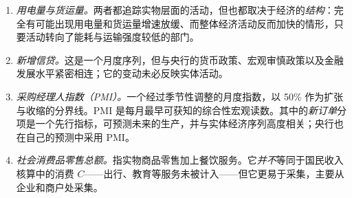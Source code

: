 \begin{enumerate}
    \item \emph{用电量与货运量。}两者都追踪实物层面的活动，但也都取决于经济的\emph{结构}：完全有可能出现用电量和货运量增速放缓、而整体经济活动反而加快的情形，只要活动转向了能耗与运输强度较低的部门。
    \item \emph{新增信贷。}这是一个月度序列，但与央行的货币政策、宏观审慎政策以及金融发展水平紧密相连；它的变动未必反映实体活动。
    \item \emph{采购经理人指数（PMI）。}一个经过季节性调整的月度指数，以 50\% 作为扩张与收缩的分界线。PMI 是每月最早可获知的综合性宏观读数。其中的\emph{新订单}分项是一个先行指标，可预测未来的生产，并与实体经济序列高度相关；央行也在自己的预测中采用 PMI。
    \item \emph{社会消费品零售总额。}指实物商品零售加上餐饮服务。它\emph{并不}等同于国民收入核算中的消费 $C$——出行、教育等服务未被计入——但它更易于采集，主要从企业和商户处采集。
\end{enumerate}

